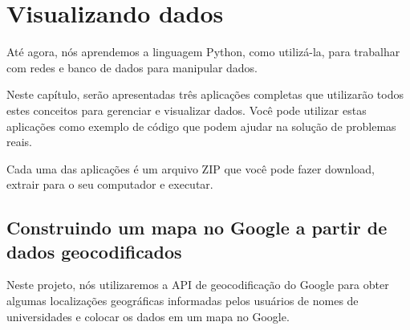 
\chapter{Visualizando dados}

Até agora, nós aprendemos a linguagem Python, como utilizá-la,
para trabalhar com redes e banco de dados para manipular dados.

Neste capítulo, serão apresentadas três aplicações completas
que utilizarão todos estes conceitos para gerenciar e visualizar
dados. Você pode utilizar estas aplicações como exemplo de código
que podem ajudar na solução de problemas reais. 

Cada uma das aplicações é um arquivo ZIP que você pode fazer
download, extrair para o seu computador e executar.

\section{Construindo um mapa no Google a partir de dados geocodificados}

Neste projeto, nós utilizaremos a API de geocodificação do
Google para obter algumas localizações geográficas informadas
pelos usuários de nomes de universidades e colocar os dados
em um mapa no Google.


